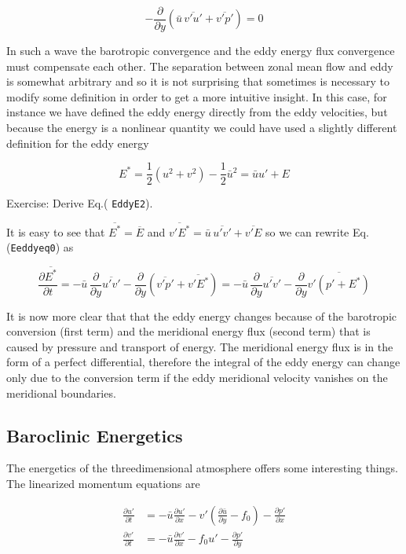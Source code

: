 {\[-\frac{\partial }{\partial y}\left( \bar{u}\, \overline{v'u'}+ \overline{v'p'}\right) = 0\]}

In such a wave the barotropic convergence and the eddy energy flux
convergence must compensate each other. The separation between zonal
mean flow and eddy is somewhat arbitrary and so it is not surprising
that sometimes is necessary to modify some definition in order to get a
more intuitive insight. In this case, for instance we have defined the
eddy energy directly from the eddy velocities, but because the energy is
a nonlinear quantity we could have used a slightly different definition
for the eddy energy

{\[E^* = \frac{1}{2}(u^2 +v^2) - \frac{1}{2}\bar{u}^2 = \bar{u}u'+E\]}

Exercise: Derive Eq.( \texttt{EddyE2}).

It is easy to see that \(\overline{E^*} = \overline{E}\) and
\(\overline{v'E^*}=\bar{u}\,\overline{u'v'} +\overline{v'E}\) so we can
rewrite Eq.(\texttt{Eeddyeq0}) as

{\[\frac{\partial \overline{E^*}}{\partial t} = -\bar{u}\,\frac{\partial }{\partial y}\overline{u'v'} -\frac{\partial }{\partial y}\left(  \overline{v'p'}+\overline{v'E^*}\right) =-\bar{u}\,\frac{\partial }{\partial y}\overline{u'v'} -\frac{\partial }{\partial y}\overline{v'\left(   p'+ E^*\right)}\]}

It is now more clear that that the eddy energy changes because of the
barotropic conversion (first term) and the meridional energy flux
(second term) that is caused by pressure and transport of energy. The
meridional energy flux is in the form of a perfect differential,
therefore the integral of the eddy energy can change only due to the
conversion term if the eddy meridional velocity vanishes on the
meridional boundaries.

\subsection{Baroclinic Energetics}\label{baroclinic-energetics}

The energetics of the threedimensional atmosphere offers some
interesting things. The linearized momentum equations are

\[\begin{aligned}
\frac{\partial u'}{\partial t} &= -\bar{u}\frac{\partial u'}{\partial x} -v'\left(\frac{\partial \bar{u}}{\partial y}-f_0\right) - \frac{\partial p'}{\partial x}\\
\frac{\partial v'}{\partial t} &= -\bar{u}\frac{\partial v'}{\partial x} -f_0u'-\frac{\partial p'}{\partial y}
\end{aligned}\]

